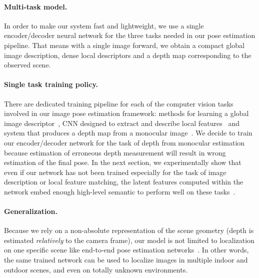\paragraph{Multi-task model.} In order to make our system fast and lightweight, we use a single encoder/decoder neural network for the three tasks needed in our pose estimation pipeline. That means with a single image forward, we obtain a compact global image description, dense local descriptors and a depth map corresponding to the observed scene.

\paragraph{Single task training policy.} There are dedicated training pipeline for each of the computer vision tasks involved in our image pose estimation framework: methods for learning a global image descriptor~\citep{Arandjelovic2017, Radenovic2017, Gordo2017}, CNN designed to extract and describe local features~\citep{Yi2016a, Rocco2018, Ono2018} and system that produces a depth map from a monocular image~\citep{Eigen2014, Godard2017, Mahjourian2018}. We decide to train our encoder/decoder network for the task of depth from monocular estimation because estimation of erroneous depth measurement will result in wrong estimation of the final pose. In the next section, we experimentally show that even if our network has not been trained especially for the task of image description or local feature matching, the latent features computed within the network embed enough high-level semantic to perform well on these tasks~\citep{Taira2018, Zamir2018}.

\paragraph{Generalization.} Because we rely on a non-absolute representation of the scene geometry (depth is estimated \textit{relatively} to the camera frame), our model is not limited to localization on one specific scene like end-to-end pose estimation networks~\citep{Kendall2017, Brachmann2017b}. In other words, the same trained network can be used to localize images in multiple indoor and outdoor scenes, and even on totally unknown environments. 
